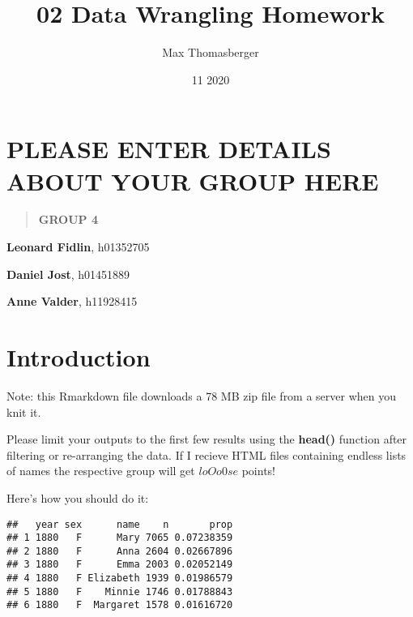 \documentclass[
]{article}
\title{02 Data Wrangling Homework}
\author{Max Thomasberger}
\date{11 2020}
\newenvironment{Shaded}{\begin{snugshade}}{\end{snugshade}}
\newcommand{\CommentTok}[1]{\textcolor[rgb]{0.56,0.35,0.01}{\textit{#1}}}
\newcommand{\KeywordTok}[1]{\textcolor[rgb]{0.13,0.29,0.53}{\textbf{#1}}}
\newcommand{\NormalTok}[1]{#1}
\newcommand{\OperatorTok}[1]{\textcolor[rgb]{0.81,0.36,0.00}{\textbf{#1}}}
\newcommand{\StringTok}[1]{\textcolor[rgb]{0.31,0.60,0.02}{#1}}
\begin{document}
\maketitle

{
\setcounter{tocdepth}{2}
\tableofcontents
}
\hypertarget{please-enter-details-about-your-group-here}{%
\section{PLEASE ENTER DETAILS ABOUT YOUR GROUP
HERE}\label{please-enter-details-about-your-group-here}}

\begin{quote}
\textbf{GROUP 4}
\end{quote}

\textbf{Leonard Fidlin}, h01352705

\textbf{Daniel Jost}, h01451889

\textbf{Anne Valder}, h11928415

\hypertarget{introduction}{%
\section{Introduction}\label{introduction}}

Note: this Rmarkdown file downloads a 78 MB zip file from a server when
you knit it.

Please limit your outputs to the first few results using the
\textbf{head()} function after filtering or re-arranging the data. If I
recieve HTML files containing endless lists of names the respective
group will get \(l o O o 0 s e\) points!

Here's how you should do it:

\begin{Shaded}
\end{Shaded}

\begin{verbatim}
##   year sex      name    n       prop
## 1 1880   F      Mary 7065 0.07238359
## 2 1880   F      Anna 2604 0.02667896
## 3 1880   F      Emma 2003 0.02052149
## 4 1880   F Elizabeth 1939 0.01986579
## 5 1880   F    Minnie 1746 0.01788843
## 6 1880   F  Margaret 1578 0.01616720
\end{verbatim}
\end{document}
